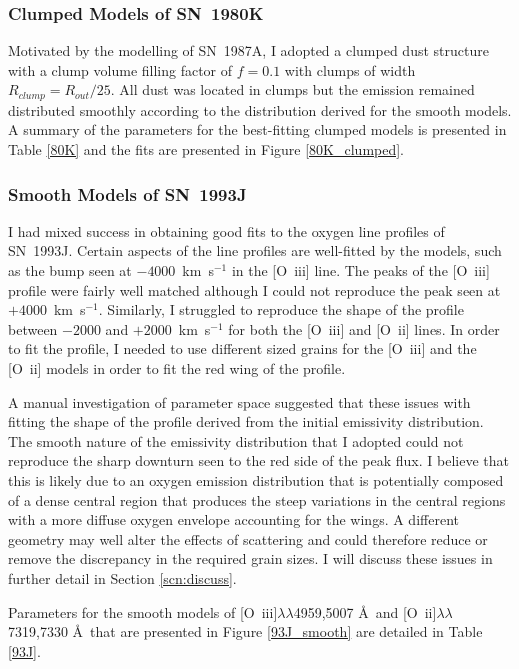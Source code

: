 \subsubsection{Clumped Models of SN~1980K}

Motivated by the modelling of SN~1987A, I adopted a clumped dust structure with a clump volume filling factor of $f=0.1$ with clumps of width $R_{clump}=R_{out}/25$.  All dust was located in clumps but the emission remained distributed smoothly according to the distribution derived for the smooth models.  A summary of the parameters for the best-fitting clumped models is presented in Table \ref{80K} and the fits are presented in Figure \ref{80K_clumped}.





\subsubsection{Smooth Models of SN~1993J}
I had mixed success in obtaining good fits to the oxygen line profiles of SN~1993J.  Certain aspects of the line profiles are well-fitted by the models, such as the bump seen at $-4000$~km~s$^{-1}$ in the [O~{\sc iii}] line.  The peaks of the [O~{\sc iii}] profile were fairly well matched although I could not reproduce the peak seen at $+4000$~km~s$^{-1}$.  Similarly, I struggled to reproduce the shape of the profile between $-2000$ and $+2000$~km~s$^{-1}$ for both the [O~{\sc iii}] and [O~{\sc ii}] lines.  In order to fit the profile, I needed to use different sized grains for the [O~{\sc iii}] and the [O~{\sc ii}] models in order to fit the red wing of the profile.


A manual investigation of parameter space suggested that these issues with fitting the shape of the profile derived from the initial emissivity distribution.  The smooth nature of the emissivity distribution that I adopted could not reproduce the sharp downturn seen to the red side of the peak flux.  I believe that this is likely due to an oxygen emission distribution that is potentially composed of a dense central region that produces the steep variations in the central regions with a more diffuse oxygen envelope accounting for the wings.  A different geometry may well alter the effects of scattering and could therefore reduce or remove the discrepancy in the required grain sizes.  I will discuss these issues in further detail in Section \ref{scn:discuss}.

Parameters for the smooth models of [O~{\sc iii}]$\lambda\lambda$4959,5007 \AA\ and [O~{\sc ii}]$\lambda\lambda$7319,7330 \AA\   that are presented in Figure \ref{93J_smooth} are detailed in Table \ref{93J}. 
 
